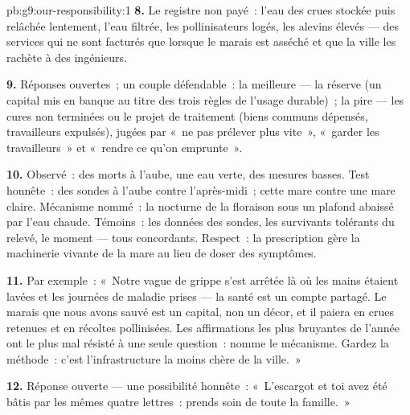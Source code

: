 \begin{solution}{pb:g9:our-responsibility:1}
\textbf{8.} Le registre non payé~: l'eau des crues stockée
puis relâchée lentement, l'eau filtrée, les pollinisateurs
logés, les alevins élevés --- des services qui ne sont
facturés que lorsque le marais est asséché et que la ville
les rachète à des ingénieurs.

\textbf{9.} Réponses ouvertes~; un couple défendable~: la
meilleure --- la réserve (un capital mis en banque au titre
des trois règles de l'usage durable)~; la pire --- les cures
non terminées ou le projet de traitement (biens communs
dépensés, travailleurs expulsés), jugées par «~ne pas
prélever plus vite~», «~garder les travailleurs~» et
«~rendre ce qu'on emprunte~».

\textbf{10.} Observé~: des  morts à l'aube, une eau
verte, des mesures basses. Test honnête~: des sondes à
l'aube contre l'après-midi~; cette mare contre une mare
claire. Mécanisme nommé~: la  nocturne de la
floraison sous un plafond abaissé par l'eau chaude.
Témoins~: les données des sondes, les survivants tolérants
du relevé, le moment --- tous concordants. Respect~: la
prescription gère la machinerie vivante de la mare au lieu
de doser des symptômes.

\textbf{11.} Par exemple~: «~Notre vague de grippe s'est
arrêtée là où les mains étaient lavées et les journées de
maladie prises --- la santé est un compte partagé. Le marais
que nous avons sauvé est un capital, non un décor, et il
paiera en crues retenues et en récoltes pollinisées. Les
affirmations les plus bruyantes de l'année ont le plus mal
résisté à une seule question~: nomme le mécanisme. Gardez la
méthode~: c'est l'infrastructure la moins chère de la
ville.~»

\textbf{12.} Réponse ouverte --- une possibilité honnête~:
«~L'escargot et toi avez été bâtis par les mêmes quatre
lettres~: prends soin de toute la famille.~»
\end{solution}
